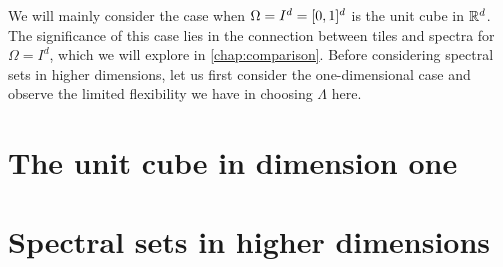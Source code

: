 \documentclass[../thesis.tex]{subfiles}
\begin{document}
We will mainly consider the case when $\Omega=I^d=[0,1]^d$ is the unit cube in $\mathbb{R}^d$. The significance of this case lies in the connection between tiles and spectra for $\Omega=I^d$, which we will explore in \cref{chap:comparison}. Before considering spectral sets in higher dimensions, let us first consider the one-dimensional case and observe the limited flexibility we have in choosing $\Lambda$ here.

\section{The unit cube in dimension one}\label{sec:complx_trig_1d}
    





\section{Spectral sets in higher dimensions}\label{sec:spec_higher_dim}
    
\end{document}
